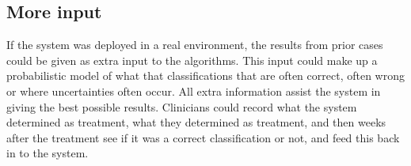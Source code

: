 \subsection{More input}
If the system was deployed in a real environment, the results from prior cases could be given as extra input to the algorithms. This input could make up a probabilistic model of what that classifications that are often correct, often wrong or where uncertainties often occur. All extra information assist the system in giving the best possible results. Clinicians could record what the system determined as treatment, what they determined as treatment, and then weeks after the treatment see if it was a correct classification or not, and feed this back in to the system.










